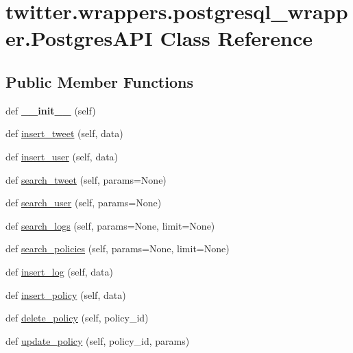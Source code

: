 \hypertarget{classtwitter_1_1wrappers_1_1postgresql__wrapper_1_1PostgresAPI}{}\section{twitter.\+wrappers.\+postgresql\+\_\+wrapper.\+Postgres\+A\+PI Class Reference}
\label{classtwitter_1_1wrappers_1_1postgresql__wrapper_1_1PostgresAPI}
\subsection*{Public Member Functions}
\begin{DoxyCompactItemize}
\item 
\mbox{\label{classtwitter_1_1wrappers_1_1postgresql__wrapper_1_1PostgresAPI_a18adcc26af89165719564d5f90d5baa2}} 
def {\bfseries \+\_\+\+\_\+init\+\_\+\+\_\+} (self)
\item 
def \hyperlink{classtwitter_1_1wrappers_1_1postgresql__wrapper_1_1PostgresAPI_a6b2b617a04ade9f12c63996210b2287b}{insert\+\_\+tweet} (self, data)
\item 
def \hyperlink{classtwitter_1_1wrappers_1_1postgresql__wrapper_1_1PostgresAPI_ae94da23c6824c6db14d62624eee98325}{insert\+\_\+user} (self, data)
\item 
def \hyperlink{classtwitter_1_1wrappers_1_1postgresql__wrapper_1_1PostgresAPI_a772c1a47184e165cfe9958c78a97a146}{search\+\_\+tweet} (self, params=None)
\item 
def \hyperlink{classtwitter_1_1wrappers_1_1postgresql__wrapper_1_1PostgresAPI_a84fa6c90c91f88a68284fba6812b043f}{search\+\_\+user} (self, params=None)
\item 
def \hyperlink{classtwitter_1_1wrappers_1_1postgresql__wrapper_1_1PostgresAPI_a85bdfe473c1bd0bd29e11c059e7cb3dc}{search\+\_\+logs} (self, params=None, limit=None)
\item 
def \hyperlink{classtwitter_1_1wrappers_1_1postgresql__wrapper_1_1PostgresAPI_aeac23865a14e4f32e90cb7daa4a03e2b}{search\+\_\+policies} (self, params=None, limit=None)
\item 
def \hyperlink{classtwitter_1_1wrappers_1_1postgresql__wrapper_1_1PostgresAPI_ae0a6d7340ffc3d83829308940a296393}{insert\+\_\+log} (self, data)
\item 
def \hyperlink{classtwitter_1_1wrappers_1_1postgresql__wrapper_1_1PostgresAPI_a97ea1442f99c7a75f996024dd3e3da8c}{insert\+\_\+policy} (self, data)
\item 
def \hyperlink{classtwitter_1_1wrappers_1_1postgresql__wrapper_1_1PostgresAPI_a93b51196b75f21a7061a027a0b530bf0}{delete\+\_\+policy} (self, policy\+\_\+id)
\item 
def \hyperlink{classtwitter_1_1wrappers_1_1postgresql__wrapper_1_1PostgresAPI_aa32ee622eb02190f09ec38919123bbb5}{update\+\_\+policy} (self, policy\+\_\+id, params)
\end{DoxyCompactItemize}
